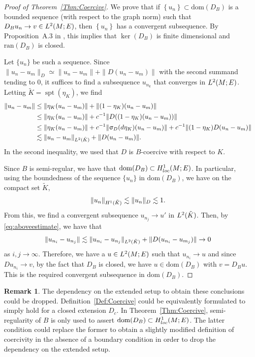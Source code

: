 \documentclass[a4paper,10pt,reqno]{amsart}
\newcommand{\sym}{\upsigma}
\newcommand{\dbrac}[1]{\left\{#1\right\}}
\newcommand{\norm}[1]{\| #1 \|}%
\newcommand{\set}[1]{\dbrac{#1}}
\newcommand{\Lp}[2][{}]{{\rm L}^{#2}_{\rm #1}}%
\newcommand{\Hard}[2][{}]{{\rm H}^{#2}_{\rm #1}}%
\newcommand{\SobH}[2][{}]{\Hard[#1]{\rm #2}}
\newcommand{\ran}{\mathrm{ran}}
\newcommand{\dom}{\mathrm{dom}}
\DeclareMathOperator{\spt}{spt}%
\theoremstyle{definition}
\newtheorem{remark}[theorem]{Remark}
\begin{document}
\begin{proof}[Proof of Theorem~\ref{Thm:Coercive}]
We prove that if $\set{u_n} \subset \dom(D_B)$ is a bounded sequence (with respect to the graph norm) such that $D_B u_n \to v \in \Lp{2}(M;E)$, then $\set{u_n}$ has a convergent subsequence.
By Proposition~A.3 in \cite{BB12}, this implies that $\ker(D_B)$ is finite dimensional and $\ran(D_B)$ is closed.

Let $\{u_n\}$ be such a sequence.
Since $\norm{u_n - u_m}_D \simeq \norm{u_n - u_m} + \norm{D(u_n - u_m)}$ with the second summand tending to $0$, it suffices to find a subsequence $u_{n_k}$ that converges in $\Lp{2}(M;E)$.
Letting $\tilde{K}=\spt(\eta_K)$, we find
\begin{align}
\norm{u_n - u_m}
 & \leq \norm{\eta_{K} (u_n - u_m)}  + \norm{(1 - \eta_{K}) (u_n - u_m)} \notag                                                    \\
 & \leq \norm{\eta_{K} (u_n - u_m)} + c^{-1} \norm{D((1 - \eta_{K})(u_n - u_m))} \notag                                            \\
 & \leq \norm{\eta_{K} (u_n - u_m)} + c^{-1} \norm{\sym_{D}(d\eta_{K})(u_n - u_m)} + c^{-1} \norm{(1-\eta_{K}) D(u_n - u_m)}\notag \\
 & \lesssim \norm{u_n - u_m}_{\Lp{2}(\tilde{K})} + \norm{D(u_n - u_m)}.
\label{eq:aboveestimate}
\end{align}
In the second inequality, we used that $D$ is $B$-coercive with respect to $K$.

Since $B$ is semi-regular, we have that $\dom(D_B) \subset \SobH[loc]{1}(M;E)$.
In particular, using the boundedness of the sequence $\{u_n\}$ in $\dom(D_B)$, we have on the compact set $\tilde{K}$,
$$ \norm{u_n}_{\SobH{1}(\tilde{K})} \lesssim \norm{u_n}_D \lesssim 1.$$
From this, we find a convergent subsequence $u_{n_j} \to u'$ in $\Lp{2}(\tilde{K})$.
Then, by \eqref{eq:aboveestimate}, we have that
$$
\norm{u_{n_i}  - u_{n_j}} \lesssim \norm{u_{n_i} - u_{n_j}}_{\Lp{2}(\tilde{K})} + \norm{D(u_{n_i} - u_{m_j})} \to 0$$
as $i, j \to \infty$.
Therefore, we have a $u \in \Lp{2}(M;E)$ such that $u_{n_i} \to u$ and since $Du_{n_i} \to v$, by the fact that $D_B$ is closed, we have  $u \in \dom(D_B)$ with $v = D_B u$.
This is the required convergent subsequence in $\dom(D_B)$.
\end{proof}


\begin{remark}
The dependency on the extended setup to obtain these conclusions could be dropped.
Definition~\ref{Def:Coercive} could be equivalently formulated to simply hold for a closed extension $D_{c}$.
In Theorem~\ref{Thm:Coercive}, semi-regularity of $B$ is only used to assert $\dom(D_{B}) \subset \SobH[loc]{1}(M;E)$.
The latter condition could replace the former to obtain a slightly modified definition of coercivity in the absence of a boundary condition in order to drop the dependency on the extended setup.
\end{remark}
\end{document}
